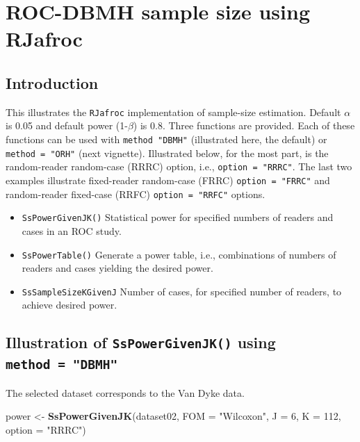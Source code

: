 \documentclass[]{book}
\newenvironment{Shaded}{\begin{snugshade}}{\end{snugshade}}
\newcommand{\DataTypeTok}[1]{\textcolor[rgb]{0.13,0.29,0.53}{#1}}
\newcommand{\DecValTok}[1]{\textcolor[rgb]{0.00,0.00,0.81}{#1}}
\newcommand{\KeywordTok}[1]{\textcolor[rgb]{0.13,0.29,0.53}{\textbf{#1}}}
\newcommand{\NormalTok}[1]{#1}
\newcommand{\StringTok}[1]{\textcolor[rgb]{0.31,0.60,0.02}{#1}}
\providecommand{\tightlist}{%
  \setlength{\itemsep}{0pt}\setlength{\parskip}{0pt}}
\begin{document}
\hypertarget{SSRocDBMHRJafroc}{%
\chapter{ROC-DBMH sample size using RJafroc}\label{SSRocDBMHRJafroc}}

\hypertarget{introduction-8}{%
\section{Introduction}\label{introduction-8}}

This illustrates the \texttt{RJafroc} implementation of sample-size estimation. Default \(\alpha\) is 0.05 and default power (1-\(\beta\)) is 0.8. Three functions are provided. Each of these functions can be used with \texttt{method\ "DBMH"} (illustrated here, the default) or \texttt{method\ =\ "ORH"} (next vignette). Illustrated below, for the most part, is the random-reader random-case (RRRC) option, i.e., \texttt{option\ =\ "RRRC"}. The last two examples illustrate fixed-reader random-case (FRRC) \texttt{option\ =\ "FRRC"} and random-reader fixed-case (RRFC) \texttt{option\ =\ "RRFC"} options.

\begin{itemize}
\tightlist
\item
  \texttt{SsPowerGivenJK()}
  Statistical power for specified numbers of readers and cases in an ROC study.
\item
  \texttt{SsPowerTable()}
  Generate a power table, i.e., combinations of numbers of readers and cases yielding the desired power.
\item
  \texttt{SsSampleSizeKGivenJ}
  Number of cases, for specified number of readers, to achieve desired power.
\end{itemize}

\hypertarget{illustration-of-sspowergivenjk-using-method-dbmh}{%
\section{\texorpdfstring{Illustration of \texttt{SsPowerGivenJK()} using \texttt{method\ =\ "DBMH"}}{Illustration of SsPowerGivenJK() using method = "DBMH"}}\label{illustration-of-sspowergivenjk-using-method-dbmh}}

The selected dataset corresponds to the Van Dyke data.

\begin{Shaded}
\begin{Highlighting}[]
\NormalTok{power <-}\StringTok{ }\KeywordTok{SsPowerGivenJK}\NormalTok{(dataset02, }\DataTypeTok{FOM =} \StringTok{"Wilcoxon"}\NormalTok{, }\DataTypeTok{J =} \DecValTok{6}\NormalTok{, }\DataTypeTok{K =} \DecValTok{112}\NormalTok{, }\DataTypeTok{option =} \StringTok{"RRRC"}\NormalTok{)}
\end{Highlighting}
\end{Shaded}
\end{document}
